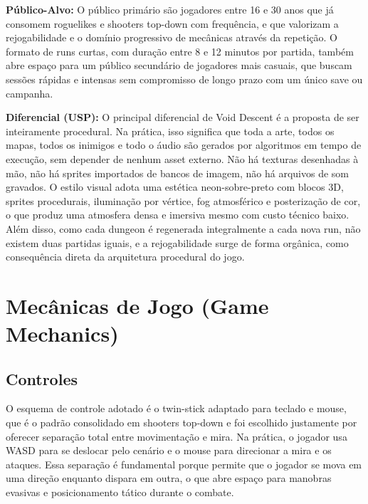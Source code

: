 \documentclass[12pt, a4paper]{article}
\begin{document}
\textbf{P\'ublico-Alvo:} O p\'ublico prim\'ario s\~ao jogadores entre 16 e 30 anos que j\'a consomem roguelikes e shooters top-down com frequ\^encia, e que valorizam a rejogabilidade e o dom\'inio progressivo de mec\^anicas atrav\'es da repeti\c{c}\~ao. O formato de runs curtas, com dura\c{c}\~ao entre 8 e 12 minutos por partida, tamb\'em abre espa\c{c}o para um p\'ublico secund\'ario de jogadores mais casuais, que buscam sess\~oes r\'apidas e intensas sem compromisso de longo prazo com um \'unico save ou campanha.

\textbf{Diferencial (USP):} O principal diferencial de Void Descent \'e a proposta de ser inteiramente procedural. Na pr\'atica, isso significa que toda a arte, todos os mapas, todos os inimigos e todo o \'audio s\~ao gerados por algoritmos em tempo de execu\c{c}\~ao, sem depender de nenhum asset externo. N\~ao h\'a texturas desenhadas \`a m\~ao, n\~ao h\'a sprites importados de bancos de imagem, n\~ao h\'a arquivos de som gravados. O estilo visual adota uma est\'etica neon-sobre-preto com blocos 3D, sprites procedurais, ilumina\c{c}\~ao por v\'ertice, fog atmosf\'erico e posteriza\c{c}\~ao de cor, o que produz uma atmosfera densa e imersiva mesmo com custo t\'ecnico baixo. Al\'em disso, como cada dungeon \'e regenerada integralmente a cada nova run, n\~ao existem duas partidas iguais, e a rejogabilidade surge de forma org\^anica, como consequ\^encia direta da arquitetura procedural do jogo.

\section{Mec\^anicas de Jogo (Game Mechanics)}

\subsection{Controles}

O esquema de controle adotado \'e o twin-stick adaptado para teclado e mouse, que \'e o padr\~ao consolidado em shooters top-down e foi escolhido justamente por oferecer separa\c{c}\~ao total entre movimenta\c{c}\~ao e mira. Na pr\'atica, o jogador usa WASD para se deslocar pelo cen\'ario e o mouse para direcionar a mira e os ataques. Essa separa\c{c}\~ao \'e fundamental porque permite que o jogador se mova em uma dire\c{c}\~ao enquanto dispara em outra, o que abre espa\c{c}o para manobras evasivas e posicionamento t\'atico durante o combate.
\end{document}

